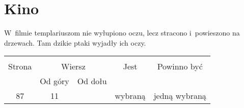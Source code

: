 \documentclass[a4paper,11pt]{article}
\begin{document}
\vspace{\spaceTwo}





























\section{Kino}

\vspace{\spaceThree}







\start {} W~filmie templariuszom nie wyłupiono oczu, lecz
stracono i~powieszono na drzewach. Tam dzikie ptaki wyjadły ich oczy.







\begin{center}

  \begin{tabular}{|c|c|c|c|c|}
    \hline
    & \multicolumn{2}{c|}{} & & \\
    Strona & \multicolumn{2}{c|}{Wiersz} & Jest
                              & Powinno być \\ \cline{2-3}
    & Od góry & Od dołu & & \\
    \hline
    87 & 11 & & wybraną & jedną wybraną \\
    \hline
  \end{tabular}

\end{center}
\end{document}
